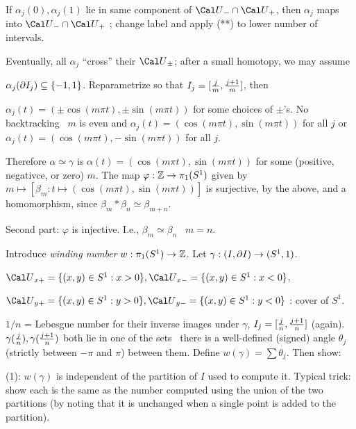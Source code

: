 \ssk

If $\alpha_j(0),\alpha_j(1)$ lie in same component of ${\Cal U}_-\cap{\Cal U}_+$,
then $\alpha_j$ maps into ${\Cal U}_-\cap{\Cal U}_+$ ; change label and apply
(**) to lower number of intervals.

\ssk

Eventually, all $\alpha_j$ ``cross'' their ${\Cal U}_\pm$; after a small homotopy,
we may assume \hfill

$\alpha_j(\partial I_j)\subseteq \{-1,1\}$. Reparametrize so that 
$I_j=[{{j}\over{m}},{{j+1}\over{m}}]$, then \hfill

$\alpha_j(t)=(\pm\cos(m\pi t),\pm\sin(m\pi t))$ for some choices of $\pm$'s.
No backtracking \rtar\ $m$ is even and 
$\alpha_{j}(t)=(\cos(m\pi t),\sin(m\pi t))$ for all $j$ 
or 
$\alpha_{j}(t)=(\cos(m\pi t),-\sin(m\pi t))$ for all $j$.


\ssk

Therefore $\alpha\simeq\gamma$ is $\alpha(t)=(\cos(m\pi t),\sin(m\pi t))$
for some (positive, negativce, or zero) $m$. The map $\varphi:{\Bbb Z}\rightarrow\pi_1(S^1)$
given by
$m\mapsto[\beta_m:t\mapsto(\cos(m\pi t),\sin(m\pi t))]$ is surjective, by the
above, and a homomorphism, since $\beta_m*\beta_n\simeq\beta_{m+n}$.

\vfill\eject

Second part: $\varphi$ is injective. I.e., $\beta_m\simeq\beta_n$ \rtar\ $m=n$.

\msk

Introduce {\it winding number} $w:\pi_1(S^1)\rightarrow {\Bbb Z}$. Let $\gamma:(I,\partial I)\rightarrow(S^1,1)$.

\ssk

${\Cal U}_{x+}=\{(x,y)\in S^1 : x>0\},{\Cal U}_{x-}=\{(x,y)\in S^1 : x<0\}$,

${\Cal U}_{y+}=\{(x,y)\in S^1 : y>0\},{\Cal U}_{y-}=\{(x,y)\in S^1 : y<0\}$ : cover
of $S^1$.

\ssk

$1/n$ = Lebesgue number for their inverse images under $\gamma$, 
$I_j=[{{j}\over{n}},{{j+1}\over{n}}]$ (again). 
$\gamma({{j}\over{n}}),\gamma({{j+1}\over{n}})$ both lie in one of the sets
\rtar\ there is a well-defined (signed) angle $\theta_j$ (strictly between 
$-\pi$ and $\pi$) between them. Define $w(\gamma)=\sum\theta_j$. Then show:

\msk

(1): $w(\gamma)$ is independent of the partition of $I$ used to compute it.
Typical trick: show each is the same as the number computed using the 
union of the two partitions (by noting that it is unchanged when a 
single point is added to the partition).

